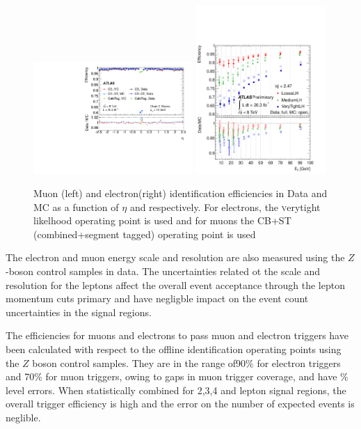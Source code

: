 \begin{figure}[htbp]
\begin{center}
\includegraphics[width=0.54\textwidth]{figs/systematics/fig_18a}
\includegraphics[width=0.44\textwidth]{figs/systematics/fig_22a}
\caption{Muon (left) and electron(right) identification efficiencies in Data and MC as a function of $\eta$ and \pt respectively. For electrons, the {\textsc verytight} likelhood operating point is used and for muons the CB+ST (combined+segment tagged) operating point is used}
\label{figure:systematics_lepidsf}
\end{center}
\end{figure}

The electron\cite{EgammaReco} and muon\cite{MuonSF} energy scale and resolution are also measured using the $Z$-boson control samples in data. The uncertainties related ot the scale and resolution for the leptons affect the overall event acceptance through the lepton momentum cuts primary and have negligble impact on the event count uncertainties in the signal regions.

The efficiencies for muons and electrons to pass muon\cite{ATLAS-CONF-2012-099} and electron triggers\cite{ATLAS-CONF-2012-048} have been calculated with respect to the offline identification operating points using the $Z$ boson control samples. They are in the range of90\% for electron triggers and 70\% for muon triggers, owing to gaps in muon trigger coverage, and have \% level errors. When statistically combined for 2,3,4 and lepton signal regions, the overall trigger efficiency is high and the error on the number of expected events is neglible. 


